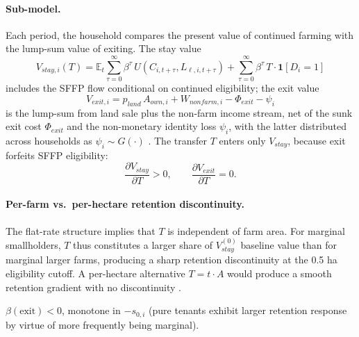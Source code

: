 \paragraph{Sub-model.} Each period, the household compares the present value of continued farming with the lump-sum value of exiting. The stay value
\begin{equation}
V_{stay,i}(T) = \mathbb{E}_t \sum_{\tau = 0}^{\infty} \beta^\tau\, U(C_{i,t+\tau}, L_{\ell,i,t+\tau})
+ \sum_{\tau=0}^{\infty} \beta^\tau\, T \cdot \mathbf{1}[D_i = 1]
\label{eq:v-stay}
\end{equation}
includes the SFFP flow conditional on continued eligibility; the exit value
\begin{equation}
V_{exit,i} = p_{land}\, A_{own,i} + W_{nonfarm,i} - \Phi_{exit} - \psi_i
\label{eq:v-exit}
\end{equation}
is the lump-sum from land sale plus the non-farm income stream, net of the sunk exit cost $\Phi_{exit}$ and the non-monetary identity loss $\psi_i$, with the latter distributed across households as $\psi_i \sim G(\cdot)$ \citep{Kimhi2000_exit, PietolaVareOudeLansink2003_exit, Foltz2004_dairy}. The transfer $T$ enters only $V_{stay}$, because exit forfeits SFFP eligibility:
\begin{equation}
\frac{\partial V_{stay}}{\partial T} > 0, \qquad \frac{\partial V_{exit}}{\partial T} = 0.
\label{eq:vstay-vexit}
\end{equation}

\paragraph{Per-farm vs.\ per-hectare retention discontinuity.} The flat-rate structure implies that $T$ is independent of farm area. For marginal smallholders, $T$ thus constitutes a larger share of $V_{stay}^{(0)}$ baseline value than for marginal larger farms, producing a sharp retention discontinuity at the 0.5 ha eligibility cutoff. A per-hectare alternative $T = t \cdot A$ would produce a smooth retention gradient with no discontinuity \citep{Kazukauskas2014_decoup}.

\begin{prediction}[Channel 5]
\label{pred:ch5}
$\beta(\text{exit}) < 0$, monotone in $-s_{0,i}$ (pure tenants exhibit larger retention response by virtue of more frequently being marginal).
\end{prediction}

